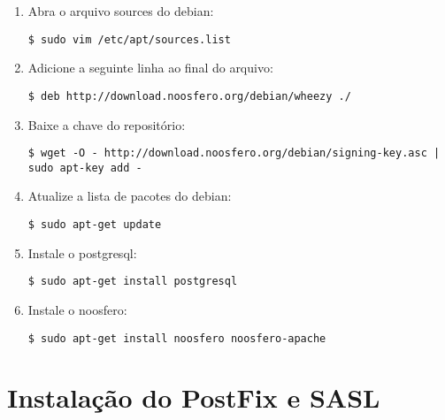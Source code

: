 \begin{enumerate}[label=\alph*)]

\item Abra o arquivo sources do debian:
\begin{lstlisting}
$ sudo vim /etc/apt/sources.list
\end{lstlisting}

\item Adicione a seguinte linha ao final do arquivo:
\begin{lstlisting}
$ deb http://download.noosfero.org/debian/wheezy ./
\end{lstlisting}

\item Baixe a chave do repositório:
\begin{lstlisting}[numbers=none, breaklines=true]
$ wget -O - http://download.noosfero.org/debian/signing-key.asc | sudo apt-key add -
\end{lstlisting}

\item Atualize a lista de pacotes do debian:
\begin{lstlisting}
$ sudo apt-get update
\end{lstlisting}

\item Instale o postgresql:
\begin{lstlisting}
$ sudo apt-get install postgresql
\end{lstlisting}

\item Instale o noosfero:
\begin{lstlisting}
$ sudo apt-get install noosfero noosfero-apache
\end{lstlisting}

\end{enumerate}

\section{Instalação do PostFix e SASL}

